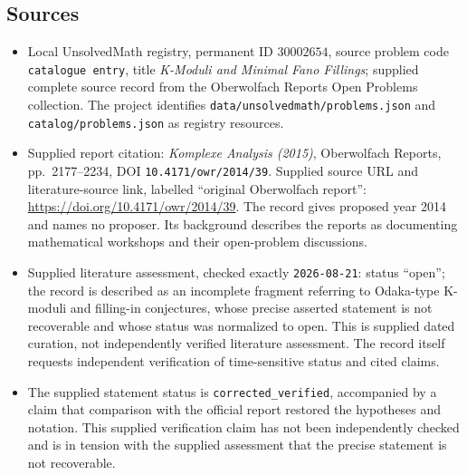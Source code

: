 \documentclass[11pt]{article}
\begin{document}
\subsection{Sources}
\begin{itemize}
\item Local UnsolvedMath registry, permanent ID \(30002654\), source problem code \texttt{catalogue entry}, title \emph{K-Moduli and Minimal Fano Fillings}; supplied complete source record from the Oberwolfach Reports Open Problems collection. The project identifies \texttt{data/unsolvedmath/problems.json} and \texttt{catalog/problems.json} as registry resources.
\item Supplied report citation: \emph{Komplexe Analysis (2015)}, Oberwolfach Reports, pp.\ 2177--2234, DOI \texttt{10.4171/owr/2014/39}. Supplied source URL and literature-source link, labelled ``original Oberwolfach report'': \url{https://doi.org/10.4171/owr/2014/39}. The record gives proposed year 2014 and names no proposer. Its background describes the reports as documenting mathematical workshops and their open-problem discussions.
\item Supplied literature assessment, checked exactly \texttt{2026-08-21}: status ``open''; the record is described as an incomplete fragment referring to Odaka-type K-moduli and filling-in conjectures, whose precise asserted statement is not recoverable and whose status was normalized to open. This is supplied dated curation, not independently verified literature assessment. The record itself requests independent verification of time-sensitive status and cited claims.
\item The supplied statement status is \texttt{corrected\_verified}, accompanied by a claim that comparison with the official report restored the hypotheses and notation. This supplied verification claim has not been independently checked and is in tension with the supplied assessment that the precise statement is not recoverable.
\end{itemize}
\end{document}
